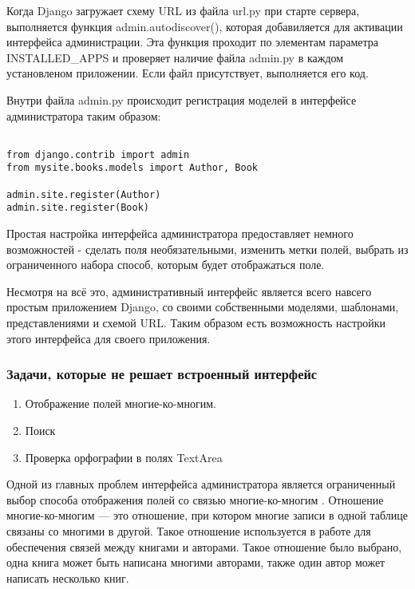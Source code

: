 Когда Django загружает схему URL из файла url.py  при старте сервера, выполняется функция admin.autodiscover(), которая добавиляется для активации интерфейса администрации. Эта функция проходит по элементам параметра INSTALLED\_APPS и проверяет наличие файла admin.py в каждом установленом приложении. Если файл присутствует, выполняется его код. 

Внутри файла admin.py происходит регистрация моделей в интерфейсе администратора таким образом: 

{
\small \begin{verbatim}

from django.contrib import admin
from mysite.books.models import Author, Book

admin.site.register(Author)
admin.site.register(Book)

\end{verbatim}
}

Простая настройка интерфейса администратора предоставляет немного возможностей - сделать поля необязательными, изменить метки полей, выбрать из ограниченного набора способ, которым будет отображаться поле.

Несмотря на всё это, административный интерфейс является всего навсего простым приложением Django, со своими собственными моделями, шаблонами, представлениями и схемой URL. Таким образом есть возможность настройки этого интерфейса для своего приложения.

\subsubsection{Задачи, которые не решает встроенный интерфейс}
\begin{enumerate}
	\item Отображение полей многие-ко-многим.
	\item Поиск
	\item Проверка орфографии в полях TextArea
\end{enumerate}

Одной из главных проблем интерфейса администратора является ограниченный выбор способа отображения полей со связью многие-ко-многим \cite{many-to-many}. Отношение многие-ко-многим  --- это отношение, при котором многие записи в одной таблице связаны со многими в другой. Такое отношение используется в работе для обеспечения связей между книгами и авторами. Такое отношение было выбрано, \tk одна книга может быть написана многими авторами, также один автор может написать несколько книг. 

